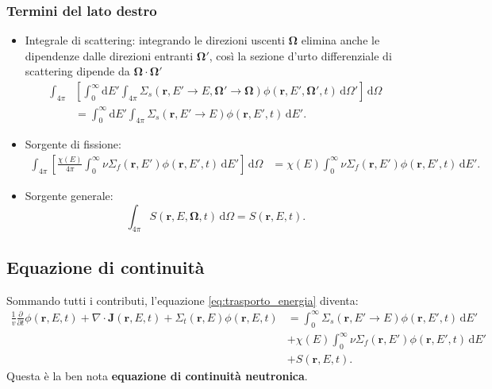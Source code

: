 \subsubsection{Termini del lato destro}
\begin{itemize}[nosep, leftmargin=*]
	\item Integrale di scattering: integrando le direzioni uscenti $\mathbf{\Omega}$ elimina anche le dipendenze dalle direzioni entranti $\mathbf{\Omega'}$, così la sezione d'urto differenziale di scattering dipende da $\mathbf{\Omega\cdot\Omega'}$
	\begin{equation}
		\begin{aligned}
			\int_{4\pi} &\left[ \int_0^\infty \mathrm{d}E' \int_{4\pi} \Sigma_s(\mathbf{r}, E' \to E, \boldsymbol{\Omega}' \to \boldsymbol{\Omega}) \phi(\mathbf{r}, E', \boldsymbol{\Omega}', t) \, \mathrm{d}\Omega' \right] \, \mathrm{d}\Omega \\
			&= \int_0^\infty \mathrm{d}E' \int_{4\pi} \Sigma_s(\mathbf{r}, E' \to E) \phi(\mathbf{r}, E', t) \, \mathrm{d}E'.
		\end{aligned}
	\end{equation}
	
	\item Sorgente di fissione:
	\begin{equation}
		\begin{aligned}
			\int_{4\pi} \left[ \frac{\chi(E)}{4\pi} \int_0^\infty \nu \Sigma_f (\mathbf{r}, E') \phi (\mathbf{r}, E', t) \, \mathrm{d}E' \right] \, \mathrm{d}\Omega &= \chi(E) \int_0^\infty \nu \Sigma_f (\mathbf{r}, E') \phi (\mathbf{r}, E', t) \, \mathrm{d}E'.
		\end{aligned}
	\end{equation}
	
	\item Sorgente generale:
	\begin{equation}
		\int_{4\pi} S (\mathbf{r}, E, \boldsymbol{\Omega}, t) \, \mathrm{d}\Omega = S (\mathbf{r}, E, t).
	\end{equation}
\end{itemize}

%
%
\subsection{Equazione di continuità}
Sommando tutti i contributi, l’equazione \eqref{eq:trasporto_energia} diventa:
\begin{equation}
	\begin{aligned}
		\frac{1}{v} \frac{\partial}{\partial t} \phi(\mathbf{r}, E, t) + \nabla \cdot \mathbf{J}(\mathbf{r}, E, t) + \Sigma_t(\mathbf{r}, E) \phi(\mathbf{r}, E, t) &= \int_0^\infty \Sigma_s(\mathbf{r}, E' \to E) \phi(\mathbf{r}, E', t) \, \mathrm{d}E' \\
		&+ \chi(E) \int_0^\infty \nu \Sigma_f(\mathbf{r}, E') \phi(\mathbf{r}, E', t) \, \mathrm{d}E' \\
		&+ S(\mathbf{r}, E, t).
	\end{aligned}
\end{equation}
Questa è la ben nota \textbf{equazione di continuità neutronica}.


